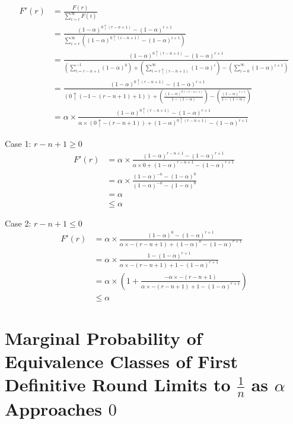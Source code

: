 \documentclass{dalcsthesis}
\begin{document}
\begin{align*}
F'(r)
  &= \frac{F(r)}{\sum_{i=r}^{\infty} F(i)}
\\&= \frac{(1-\alpha)^{0 \uparrow (r-n+1)} - (1-\alpha)^{r+1}}{\sum_{i=r}^{\infty} ((1-\alpha)^{0 \uparrow (i-n+1)} - (1-\alpha)^{i+1})}
\\&= \frac{(1-\alpha)^{0 \uparrow (r-n+1)} - (1-\alpha)^{r+1}}{(\sum_{i=r-n+1}^{-1} (1-\alpha)^0) + (\sum_{i=r \uparrow (r-n+1)}^{\infty} (1-\alpha)^i) - (\sum_{i=0}^{\infty} (1-\alpha)^{i+1})}
\\&= \frac{(1-\alpha)^{0 \uparrow (r-n+1)} - (1-\alpha)^{r+1}}{(0 \uparrow (-1 - (r-n+1) + 1)) + (\frac{(1-\alpha)^{0 \uparrow (r-n+1)}}{1 - (1-\alpha)}) - (\frac{(1-\alpha)^{r+1}}{1 - (1-\alpha)})}
\\&= \alpha \times \frac{(1-\alpha)^{0 \uparrow (r-n+1)} - (1-\alpha)^{r+1}}{\alpha \times (0 \uparrow -(r-n+1)) + (1-\alpha)^{0 \uparrow (r-n+1)} - (1-\alpha)^{r+1}}
\end{align*}

Case 1: $r-n+1 \geq 0$
\begin{align*}
F'(r)
  &= \alpha \times \frac{(1-\alpha)^{r-n+1} - (1-\alpha)^{r+1}}{\alpha \times 0 + (1-\alpha)^{r-n+1} - (1-\alpha)^{r+1}}
\\&= \alpha \times \frac{(1-\alpha)^{-n} - (1-\alpha)^{0}}{(1-\alpha)^{-n} - (1-\alpha)^{0}}
\\&= \alpha
\\&\leq \alpha
\end{align*}

Case 2: $r-n+1 \leq 0$
\begin{align*}
F'(r)
  &= \alpha \times \frac{(1-\alpha)^0 - (1-\alpha)^{r+1}}{\alpha \times -(r-n+1) + (1-\alpha)^0 - (1-\alpha)^{r+1}}
\\&= \alpha \times \frac{1 - (1-\alpha)^{r+1}}{\alpha \times -(r-n+1) + 1 - (1-\alpha)^{r+1}}
\\&= \alpha \times (1 + \frac{-\alpha \times -(r-n+1)}{\alpha \times -(r-n+1) + 1 - (1-\alpha)^{r+1}})
\\&\leq \alpha
\end{align*}

\section{Marginal Probability of Equivalence Classes of First Definitive Round Limits to $\frac{1}{n}$ as $\alpha$ Approaches $0$}
\label{Appendix:ABCP:Probabilities:MarginalEquivalenceClassDefinitiveRoundApproaches1OverN}
\end{document}
